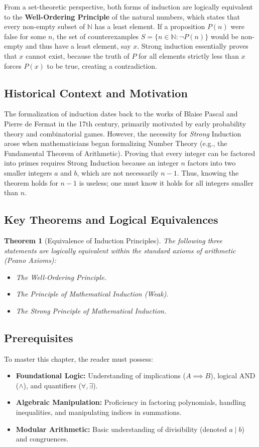 \documentclass[11pt, a4paper]{article}
\newtheorem{theorem}{Theorem}[section]
\theoremstyle{definition}
\theoremstyle{remark}
\newcommand{\N}{\mathbb{N}}
\begin{document}
From a set-theoretic perspective, both forms of induction are logically equivalent to the \textbf{Well-Ordering Principle} of the natural numbers, which states that every non-empty subset of $\N$ has a least element. If a proposition $P(n)$ were false for some $n$, the set of counterexamples $S = \{n \in \N : \neg P(n)\}$ would be non-empty and thus have a least element, say $x$. Strong induction essentially proves that $x$ cannot exist, because the truth of $P$ for all elements strictly less than $x$ forces $P(x)$ to be true, creating a contradiction.

\subsection{Historical Context and Motivation}
The formalization of induction dates back to the works of Blaise Pascal and Pierre de Fermat in the 17th century, primarily motivated by early probability theory and combinatorial games. However, the necessity for \textit{Strong} Induction arose when mathematicians began formalizing Number Theory (e.g., the Fundamental Theorem of Arithmetic). Proving that every integer can be factored into primes requires Strong Induction because an integer $n$ factors into two smaller integers $a$ and $b$, which are not necessarily $n-1$. Thus, knowing the theorem holds for $n-1$ is useless; one must know it holds for all integers smaller than $n$.

\subsection{Key Theorems and Logical Equivalences}
\begin{theorem}[Equivalence of Induction Principles]
    The following three statements are logically equivalent within the standard axioms of arithmetic (Peano Axioms):
    \begin{itemize}
        \item The Well-Ordering Principle.
        \item The Principle of Mathematical Induction (Weak).
        \item The Strong Principle of Mathematical Induction.
    \end{itemize}
\end{theorem}

\subsection{Prerequisites}
To master this chapter, the reader must possess:
\begin{itemize}
    \item \textbf{Foundational Logic:} Understanding of implications ($A \implies B$), logical AND ($\land$), and quantifiers ($\forall, \exists$).
    \item \textbf{Algebraic Manipulation:} Proficiency in factoring polynomials, handling inequalities, and manipulating indices in summations.
    \item \textbf{Modular Arithmetic:} Basic understanding of divisibility (denoted $a \mid b$) and congruences.
\end{itemize}
\end{document}
